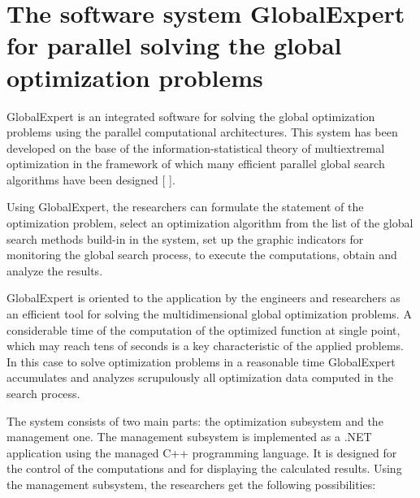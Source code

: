 \section{The software system GlobalExpert for parallel solving the global optimization problems}

GlobalExpert is an integrated software for solving the global optimization problems using the parallel computational architectures. This system has been developed on the base of the information-statistical theory of multiextremal optimization in the framework of which many efficient parallel global search algorithms have been designed [ ].

Using GlobalExpert, the researchers can formulate the statement of the optimization problem, select an optimization algorithm from the list of the global search methods build-in in the system, set up the graphic indicators for monitoring the global search process, to execute the computations, obtain and analyze the results. 

GlobalExpert is oriented to the application by the engineers and researchers as an efficient tool for solving the multidimensional global optimization problems. 
A considerable time of the computation of the optimized function at single point, which may reach tens of seconds is a key characteristic of the applied problems. In this case to solve optimization problems in a reasonable time GlobalExpert accumulates and analyzes scrupulously all optimization data computed in the search process. 

The system consists of two main parts: the optimization subsystem and the management one. The management subsystem is implemented as a .NET application using the managed C++ programming language. It is designed for the control of the computations and for displaying the calculated results. Using the management subsystem, the researchers get the following possibilities:

